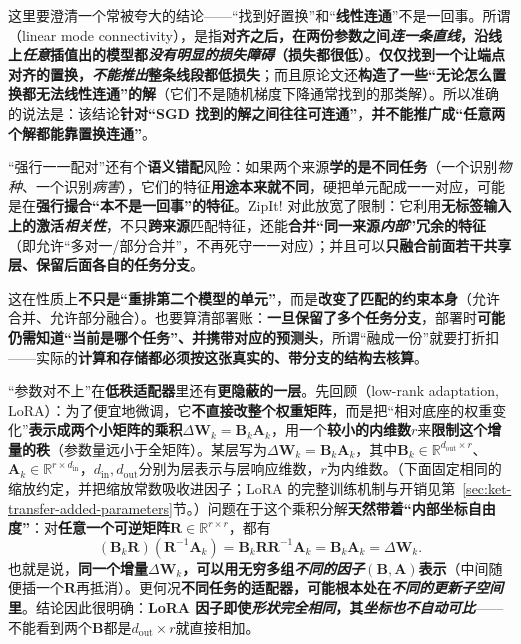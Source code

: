 这里要澄清一个常被夸大的结论——“找到好置换”和“\textbf{线性连通}”不是一回事。所谓（linear mode connectivity），是指\textbf{对齐之后，在两份参数之间\emph{连一条直线}，沿线上\emph{任意}插值出的模型都\emph{没有明显的损失障碍}（损失都很低）}。\textbf{仅仅找到一个让端点对齐的置换，\emph{不能推出}整条线段都低损失}；而且原论文还\textbf{构造了一些“无论怎么置换都无法线性连通”的解}（它们不是随机梯度下降通常找到的那类解）。所以准确的说法是：该结论\textbf{针对“SGD 找到的解之间往往可连通”}，\textbf{并不能推广成“任意两个解都能靠置换连通”}。

“强行一一配对”还有个\textbf{语义错配}风险：如果两个来源\textbf{学的是不同任务}（一个识别\emph{物种}、一个识别\emph{病害}），它们的特征\textbf{用途本来就不同}，硬把单元配成一一对应，可能是在\textbf{强行撮合“本不是一回事”的特征}。ZipIt! 对此放宽了限制：它利用\textbf{无标签输入上的激活\emph{相关性}}，不只\textbf{跨来源}匹配特征，还能\textbf{合并“同一来源\emph{内部}”冗余的特征}（即允许“多对一/部分合并”，不再死守一一对应）；并且可以\textbf{只融合前面若干共享层、保留后面各自的任务分支}。

这在性质上\textbf{不只是“重排第二个模型的单元”}，而是\textbf{改变了匹配的约束本身}（允许合并、允许部分融合）。也要算清部署账：\textbf{一旦保留了多个任务分支}，部署时\textbf{可能仍需知道“当前是哪个任务”、并携带对应的预测头}，所谓“融成一份”就要打折扣——实际的\textbf{计算和存储都必须按这张真实的、带分支的结构去核算}。

“参数对不上”在\textbf{低秩适配器}里还有\textbf{更隐蔽的一层}。先回顾（low-rank adaptation, LoRA）：为了便宜地微调，它\textbf{不直接改整个权重矩阵}，而是把“相对底座的权重变化”\textbf{表示成两个小矩阵的乘积}$\Delta\bm{W}_k=\bm{B}_k\bm{A}_k$，用一个\textbf{较小的内维数}$r$来\textbf{限制这个增量的秩}（参数量远小于全矩阵）。某层写为$\Delta\bm{W}_k=\bm{B}_k\bm{A}_k$，其中$\bm{B}_k\in\mathbb{R}^{d_{\mathrm{out}}\times r}$、$\bm{A}_k\in\mathbb{R}^{r\times d_{\mathrm{in}}}$，$d_{\mathrm{in}},d_{\mathrm{out}}$分别为层表示与层响应维数，$r$为内维数。（下面固定相同的缩放约定，并把缩放常数吸收进因子；LoRA 的完整训练机制与开销见第~\ref{sec:ket-transfer-added-parameters}节。）问题在于这个乘积分解\textbf{天然带着“内部坐标自由度”}：对\textbf{任意一个可逆矩阵}$\bm{R}\in\mathbb{R}^{r\times r}$，都有
$$(\bm{B}_k\bm{R})(\bm{R}^{-1}\bm{A}_k)=\bm{B}_k\bm{R}\bm{R}^{-1}\bm{A}_k=\bm{B}_k\bm{A}_k=\Delta\bm{W}_k.$$
也就是说，\textbf{同一个增量$\Delta\bm{W}_k$，可以用无穷多组\emph{不同的因子}$(\bm{B},\bm{A})$表示}（中间随便插一个$\bm{R}$再抵消）。更何况\textbf{不同任务的适配器，可能根本处在\emph{不同的更新子空间}里}。结论因此很明确：\textbf{LoRA 因子即使\emph{形状完全相同}，其\emph{坐标也\emph{不}自动可比}}——不能看到两个$\bm{B}$都是$d_{\mathrm{out}}\times r$就直接相加。

